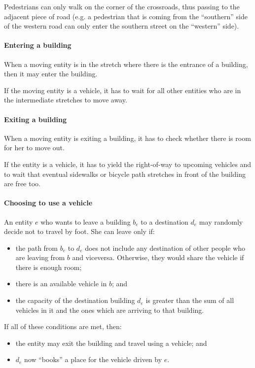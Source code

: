 Pedestrians can only walk on the corner of the crossroads, thus passing to the
adjacent piece of road (e.g. a pedestrian that is coming from the ``southern''
side of the western road can only enter the southern street on the ``western''
side).

\paragraph{Entering a building} When a moving entity is in the stretch where
there is the entrance of a building, then it may enter the building.

If the moving entity is a vehicle, it has to wait for all other entities who
are in the intermediate stretches to move away.

\paragraph{Exiting a building} When a moving entity is exiting a building, it
has to check whether there is room for her to move out.

If the entity is a vehicle, it has to yield the right-of-way to upcoming
vehicles and to wait that eventual sidewalks or bicycle path stretches in front
of the building are free too.

\paragraph{Choosing to use a vehicle} An entity $e$ who wants to leave a
building $b_e$ to a destination $d_e$ may randomly decide not to travel by
foot. She can leave only if:

\begin{itemize}
  \item the path from $b_e$ to $d_e$ does not include any destination of other
    people who are leaving from $b$ and viceversa. Otherwise, they would share
    the vehicle if there is enough room;
  \item there is an available vehicle in $b$; and
  \item the capacity of the destination building $d_e$ is greater than the sum
    of all vehicles in it and the ones which are arriving to that building.
\end{itemize}

If all of these conditions are met, then:
\begin{itemize}
  \item the entity may exit the building and travel using a vehicle; and
  \item $d_e$ now ``books'' a place for the vehicle driven by $e$.
\end{itemize}

